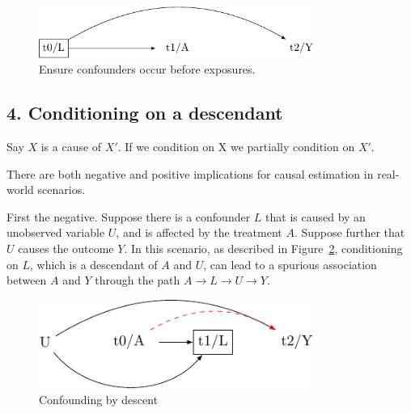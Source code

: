 \documentclass[
  singlecolumn]{report}
\begin{document}
\begin{figure}

{\centering \includegraphics[width=0.8\textwidth,height=\textheight]{causal-dags_files/figure-pdf/fig-dag-mediator-solution-1.pdf}

}

\caption{\label{fig-dag-mediator-solution}Ensure confounders occur
before exposures.}

\end{figure}

\hypertarget{conditioning-on-a-descendant}{%
\subsection{4. Conditioning on a
descendant}\label{conditioning-on-a-descendant}}

Say \(X\) is a cause of \(X\prime\). If we condition on X we partially
condition on \(X\prime\).

There are both negative and positive implications for causal estimation
in real-world scenarios.

First the negative. Suppose there is a confounder \(L\) that is caused
by an unobserved variable \(U\), and is affected by the treatment \(A\).
Suppose further that \(U\) causes the outcome \(Y\). In this scenario,
as described in Figure~\ref{fig-dag-descendent}, conditioning on \(L\),
which is a descendant of \(A\) and \(U\), can lead to a spurious
association between \(A\) and \(Y\) through the path
\(A \to L \to U \to Y\).

\begin{figure}

{\centering \includegraphics[width=0.8\textwidth,height=\textheight]{causal-dags_files/figure-pdf/fig-dag-descendent-1.pdf}

}

\caption{\label{fig-dag-descendent}Confounding by descent}

\end{figure}
\end{document}
